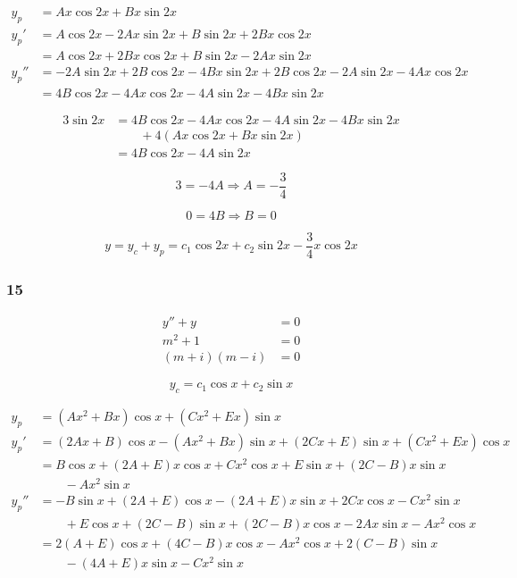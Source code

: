 \documentclass{article}
\begin{document}
\begin{align*}
  y_p   & = A x \cos 2x + B x \sin 2x                                                      \\
  y_p'  & = A \cos 2x - 2Ax \sin 2x + B \sin 2x + 2 B x \cos 2x                            \\
        & = A \cos 2x + 2Bx \cos 2x + B \sin 2x - 2Ax \sin 2x                              \\
  y_p'' & = -2A \sin 2x + 2B \cos 2x - 4Bx \sin 2x + 2B \cos 2x - 2A \sin 2x - 4Ax \cos 2x \\
        & = 4B \cos 2x - 4Ax \cos 2x - 4A \sin 2x - 4Bx \sin 2x
\end{align*}

\begin{align*}
  3 \sin 2x & = 4B \cos 2x - 4Ax \cos 2x - 4A \sin 2x - 4Bx \sin 2x \\
            & \qquad + 4(A x \cos 2x + B x \sin 2x)                 \\
            & = 4B \cos 2x - 4A \sin 2x
\end{align*}

\[3 = -4A \Rightarrow A = -\frac{3}{4}\]

\[0 = 4B \Rightarrow B = 0\]

\[y = y_c + y_p = c_1 \cos 2x + c_2 \sin 2x - \frac{3}{4} x \cos 2x\]

\subsubsection{15}

\begin{align*}
  y'' + y         & = 0 \\
  m^2 + 1         & = 0 \\
  (m + i) (m - i) & = 0
\end{align*}

\[y_c = c_1 \cos x + c_2 \sin x\]

\begin{align*}
  y_p   & = (Ax^2 + Bx) \cos x + (Cx^2 + Ex) \sin x                                          \\
  y_p'  & = (2Ax + B) \cos x - (Ax^2 + Bx) \sin x + (2Cx + E) \sin x + (Cx^2 + Ex) \cos x    \\
        & = B \cos x + (2A + E)x \cos x + Cx^2 \cos x + E \sin x + (2C - B)x \sin x          \\
        & \qquad - Ax^2 \sin x                                                               \\
  y_p'' & = -B \sin x + (2 A + E) \cos x - (2A + E) x \sin x + 2Cx \cos x - Cx^2 \sin x      \\
        & \qquad + E \cos x + (2C - B) \sin x + (2C - B) x \cos x - 2Ax \sin x - Ax^2 \cos x \\
        & = 2 (A + E) \cos x + (4C - B) x \cos x - Ax^2 \cos x + 2 (C - B) \sin x            \\
        & \qquad - (4A + E) x \sin x - C x^2 \sin x
\end{align*}
\end{document}
